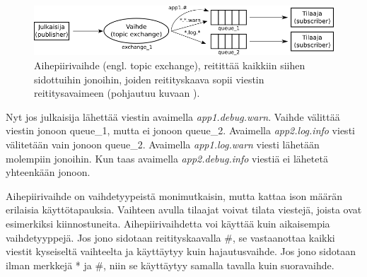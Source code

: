 \begin{figure}[ht!]
	\includegraphics[width=1\textwidth]{pictures/amqp-topic-exchange.png}
	\caption{Aihepiirivaihde (engl. topic exchange), reitittää kaikkiin siihen sidottuihin jonoihin, joiden reitityskaava sopii viestin reititysavaimeen (pohjautuu kuvaan \mbox{\cite{RabbitMQ-Tutorial-Topics}}).}
	\label{fig:amqp-topic-exchange}
\end{figure}

Nyt jos julkaisija lähettää viestin avaimella \emph{app1.debug.warn}. Vaihde välittää viestin jonoon queue\_1, mutta ei jonoon queue\_2. Avaimella \emph{app2.log.info} viesti välitetään vain jonoon queue\_2. Avaimella \emph{app1.log.warn} viesti lähetään molempiin jonoihin. Kun taas avaimella \emph{app2.debug.info} viestiä ei lähetetä yhteenkään jonoon.

Aihepiirivaihde on vaihdetyypeistä monimutkaisin, mutta kattaa ison määrän erilaisia käyttötapauksia. Vaihteen avulla tilaajat voivat tilata viestejä, joista ovat esimerkiksi kiinnostuneita. Aihepiirivaihdetta voi käyttää kuin aikaisempia vaihdetyyppejä. Jos jono sidotaan reitityskaavalla \#, se vastaanottaa kaikki viestit kyseiseltä vaihteelta ja käyttäytyy kuin hajautusvaihde. Jos jono sidotaan ilman merkkejä * ja \#, niin se käyttäytyy samalla tavalla kuin suoravaihde. \mbox{\cite{RabbitMQ-Tutorial-Topics}}



